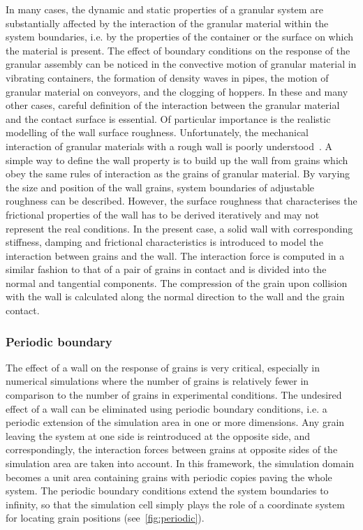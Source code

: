 In many cases, the dynamic and static properties of a granular system are 
substantially affected by the interaction of the granular material within the 
system boundaries, i.e. by the properties of the container or the surface on 
which the material is present. The effect of boundary conditions on 
the response of the granular assembly can be noticed in the convective motion 
of granular material in vibrating containers, the formation of density waves in 
pipes, the motion of granular material on conveyors, and the clogging of 
hoppers. In these and many other cases, careful definition of the interaction 
between the granular material and the contact surface is essential. Of 
particular importance is the realistic modelling of the wall surface roughness. 
Unfortunately, the mechanical interaction of granular materials with a rough 
wall is poorly understood~\citep{Poschel2005}. A simple way to define the wall 
property is to build up the wall from grains which obey the same rules of 
interaction as the grains of granular material. By varying the size and 
position of the wall grains, system boundaries of adjustable roughness can be 
described. However, the surface roughness that characterises the frictional 
properties of the wall has to be derived iteratively and may not represent the 
real conditions. In the present case, a solid wall with corresponding 
stiffness, damping and frictional characteristics is introduced to model the 
interaction between grains and the wall. The interaction force is computed in a 
similar fashion to that of a pair of grains in contact and is divided into the 
normal and tangential components. The compression of the grain upon collision 
with the wall is calculated along the normal direction to the wall and 
the grain contact.

\subsubsection{Periodic boundary} \label{sec:periodic}
The effect of a wall on the response of grains is very critical, especially 
in numerical simulations where the number of grains is relatively fewer in 
comparison to the number of grains in experimental conditions. The undesired 
effect of a wall can be eliminated using periodic boundary conditions, i.e. a 
periodic extension of the simulation 
area in one or more dimensions. Any grain leaving the system at one side is 
reintroduced at the opposite side, and correspondingly, the interaction 
forces between grains at opposite sides of the simulation area are taken into 
account. In this framework, the simulation domain becomes a unit area 
containing grains with periodic copies paving the whole system. The periodic 
boundary conditions extend the system boundaries to infinity, so that the 
simulation cell simply plays the role of a coordinate system for locating grain 
positions (see~\cref{fig:periodic}). 


